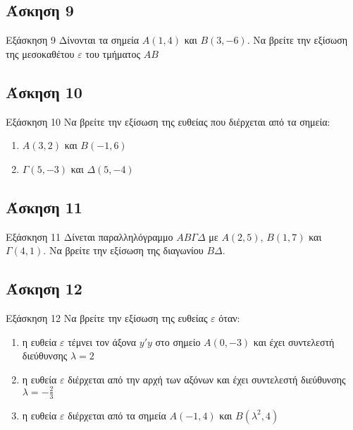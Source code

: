 \documentclass[greek]{beamer}
\begin{document}
\subsection{Άσκηση 9}
\begin{frame}[label=Άσκηση9]{Εξάσκηση 9}
 Δίνονται τα σημεία $Α(1,4)$ και $Β(3,-6)$. Να βρείτε την εξίσωση της μεσοκαθέτου $ε$ του τμήματος $ΑΒ$

\end{frame}

\subsection{Άσκηση 10}
\begin{frame}[label=Άσκηση10]{Εξάσκηση 10}
 Να βρείτε την εξίσωση της ευθείας που διέρχεται από τα σημεία:
 \begin{enumerate}
  \item<1-> $Α(3,2)$ και $Β(-1,6)$
  \item<2-> $Γ(5,-3)$ και $Δ(5,-4)$
 \end{enumerate}

\end{frame}

\subsection{Άσκηση 11}
\begin{frame}[label=Άσκηση11]{Εξάσκηση 11}
 Δίνεται παραλληλόγραμμο $ΑΒΓΔ$ με $Α(2,5)$, $Β(1,7)$ και $Γ(4,1)$. Να βρείτε την εξίσωση της διαγωνίου $ΒΔ$.

\end{frame}

\subsection{Άσκηση 12}
\begin{frame}[label=Άσκηση12]{Εξάσκηση 12}
 Να βρείτε την εξίσωση της ευθείας $ε$ όταν:
 \begin{enumerate}
  \item<1-> η ευθεία $ε$ τέμνει τον άξονα $y'y$ στο σημείο $Α(0,-3)$ και έχει συντελεστή διεύθυνσης $λ=2$
  \item<2-> η ευθεία $ε$ διέρχεται από την αρχή των αξόνων και έχει συντελεστή διεύθυνσης $λ=-\frac{2}{3}$
  \item<3-> η ευθεία $ε$ διέρχεται από τα σημεία $Α(-1,4)$ και $Β(λ^2,4)$
 \end{enumerate}

\end{frame}
\end{document}
